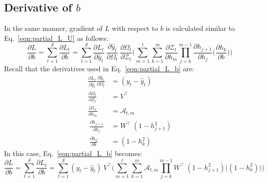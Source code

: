 \documentclass{article}
\begin{document}
\subsection{Derivative of $b$}
In the same manner, gradient of $L$ with respect to $b$ is calculated similar to Eq.~\eqref{eqn:partial_L_U} as follows:
\begin{equation}
\frac{\partial L}{ \partial{b}} = \sum_{t=1}^{\mathcal{S}} \frac{\partial L_t}{ \partial{b}} =
\sum_{t=1}^{\mathcal{S}}
\frac{\partial L_t}{\partial \hat{y}_t}~\frac{\partial \hat{y}_t}{\partial \Omega_t}~\frac{\partial \Omega_t}{ \partial \mathcal{Z}_t} \biggl( 
\sum_{m=1}^{t}
\sum_{k=1}^{m} \frac{\partial \mathcal{Z}_t}{ \partial h_m} 
\prod_{j=k}^{m-1} \frac{\partial h_{j+1}}{ \partial h_j} 
\biggl( \frac{\partial h_k}{ \partial b} \biggl) \biggl)
\label{eqn:partial_L_b}
\end{equation}
Recall that the derivatives used in Eq.~\eqref{eqn:partial_L_b} are:
\begin{align*}
        \frac{\partial L_t}{\partial \hat{y}_t}\frac{\partial \hat{y}_t}{\partial \Omega_t} &= (y_t - \hat{y}_t)\\
        \frac{\partial \Omega_t}{\partial Z_t}
        &= V^\top\\
        \frac{\partial \mathcal{Z}_t}{ \partial h_m}&= \mathcal{A}_{t,m} \\
        ~\frac{\partial h_{j+1}}{\partial h_{j}}
        &= W^\top ~ (1 - h_{j+1}^2) \\
        ~\frac{\partial h_k}{\partial b}&= (1-h_k^2)
\end{align*}
In this case, Eq.~\eqref{eqn:partial_L_b} becomes:
\begin{equation}
	\frac{\partial L}{ \partial{b}} = \sum_{t=1}^{\mathcal{S}} \frac{\partial L_t}{ \partial{b}} =
\sum_{t=1}^{\mathcal{S}}
(y_t - \hat{y}_t)~V^\top \biggl( 
\sum_{m=1}^{t}
\sum_{k=1}^{m} \mathcal{A}_{t,m} 
\prod_{j=k}^{m-1} W^\top ~ (1 - h_{j+1}^2)
\biggl( (1-h_k^2) \biggl) \biggl)
 \label{eqn:partial_L_ab}
\end{equation}
\end{document}
